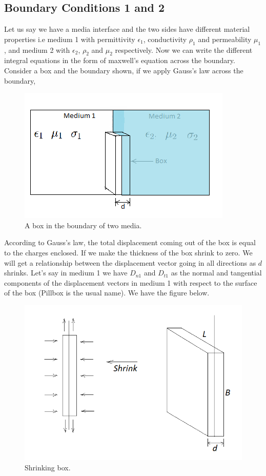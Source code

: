 \subsection{Boundary Conditions 1 and 2}
Let us say we have a media interface and the two sides have different material properties i.e medium 1 with permittivity $\epsilon_1$, conductivity $\rho_1$ and permeability $\mu_1$, and medium 2 with $\epsilon_2$, $\rho_2$ and $\mu_2$ respectively. Now we can write the different integral equations in the form of maxwell's equation across the boundary. Consider a box and the boundary shown, if we apply Gauss's law across the boundary,
\begin{figure}[h]
\centering
\includegraphics[width=1\linewidth]{./graphics/diemedium1}
\caption{A box in the boundary of two media.}
\end{figure}

According to Gauss's law, the total displacement coming out of the box is equal to the charges enclosed. If we make the thickness of the box shrink to zero. We will get a relationship between the displacement vector going in all directions as $d$ shrinks.  Let's say in medium 1 we have $D_{n1}$ and $D_{t1}$ as the normal and tangential components of the displacement vectors in medium 1 with respect to the surface of the box (Pillbox is the usual name). We have the figure below.
\begin{figure}[h]
\centering
\includegraphics[width=.7\linewidth]{./graphics/diemedium2}
\caption{Shrinking box.}
\end{figure}

